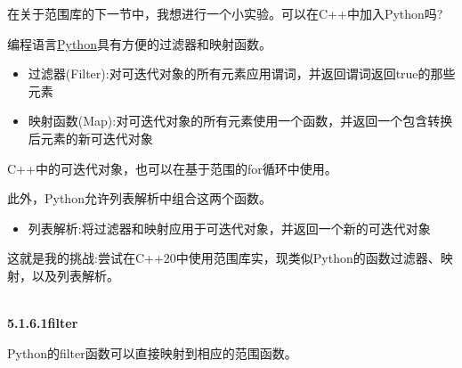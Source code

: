 在关于范围库的下一节中，我想进行一个小实验。可以在C++中加入Python吗?


编程语言\href{https://www.python.org/}{Python}具有方便的过滤器和映射函数。

\begin{itemize}
\item 
过滤器(Filter):对可迭代对象的所有元素应用谓词，并返回谓词返回true的那些元素

\item 
映射函数(Map):对可迭代对象的所有元素使用一个函数，并返回一个包含转换后元素的新可迭代对象
\end{itemize}

C++中的可迭代对象，也可以在基于范围的for循环中使用。

此外，Python允许列表解析中组合这两个函数。

\begin{itemize}
\item 
列表解析:将过滤器和映射应用于可迭代对象，并返回一个新的可迭代对象
\end{itemize}

这就是我的挑战:尝试在C++20中使用范围库实，现类似Python的函数过滤器、映射，以及列表解析。

\hspace*{\fill} \\ %
\noindent
\textbf{5.1.6.1\hspace{0.2cm}filter}

Python的filter函数可以直接映射到相应的范围函数。

